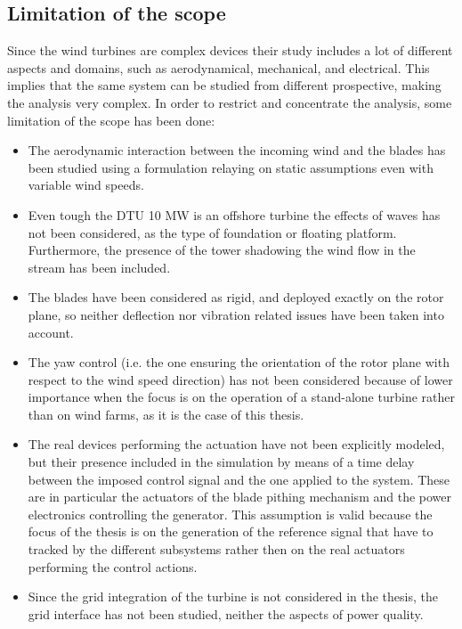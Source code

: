 \subsection{Limitation of the scope}\label{subsec:limitation_of_scope}
Since the wind turbines are complex devices their study includes a lot of different aspects and domains, such as aerodynamical, mechanical, and electrical. This implies that the same system can be studied from different prospective, making the analysis very complex. In order to restrict and concentrate the analysis, some limitation of the scope has been done:
\begin{itemize}
  \item The aerodynamic interaction between the incoming wind and the blades has been studied using a formulation relaying on static assumptions even with variable wind speeds.
  \item Even tough the DTU 10 MW is an offshore turbine the effects of waves has not been considered, as the type of foundation or floating platform. Furthermore, the presence of the tower shadowing the wind flow in the stream has been included.
  \item The blades have been considered as rigid, and deployed exactly on the rotor plane, so neither deflection nor vibration related issues have been taken into account.
  \item The yaw control (i.e. the one ensuring the orientation of the rotor plane with respect to the wind speed direction) has not been considered because of lower importance when the focus is on the operation of a stand-alone turbine rather than on wind farms, as it is the case of this thesis.
  \item The real devices performing the actuation have not been explicitly modeled, but their presence included in the simulation by means of a time delay between the imposed control signal and the one applied to the system. These are in particular the actuators of the blade pithing mechanism and the power electronics controlling the generator. This assumption is valid because the focus of the thesis is on the generation of the reference signal that have to tracked by the different subsystems rather then on the real actuators performing the control actions.
  \item Since the grid integration of the turbine is not considered in the thesis, the grid interface has not been studied, neither the aspects of power quality.    
\end{itemize}